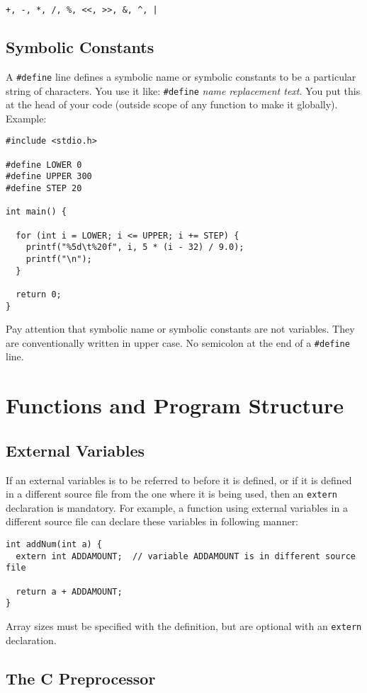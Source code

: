\documentclass[11pt]{article}
\begin{document}
\texttt{+, -, *, /, \%, <<, >>, \&, \textasciicircum{}, |}
\subsection{Symbolic Constants}
\label{sec:orgb128142}
A \texttt{\#define} line defines a symbolic name or symbolic constants to be a particular string of characters. You use it like: \texttt{\#define} \emph{name} \emph{replacement text}. You put this at the head of your code (outside scope of any function to make it globally). Example:
\begin{verbatim}
#include <stdio.h>

#define LOWER 0
#define UPPER 300
#define STEP 20

int main() {

  for (int i = LOWER; i <= UPPER; i += STEP) {
    printf("%5d\t%20f", i, 5 * (i - 32) / 9.0);
    printf("\n");
  }

  return 0;
}
\end{verbatim}
Pay attention that symbolic name or symbolic constants are not variables. They are conventionally written in upper case. No semicolon at the end of a \texttt{\#define} line.
\section{Functions and Program Structure}
\label{sec:org8a02354}
\subsection{External Variables}
\label{sec:org8441421}
If an external variables is to be referred to before it is defined, or if it is defined in a different source file from the one where it is being used, then an \texttt{extern} declaration is mandatory. For example, a function using external variables in a different source file can declare these variables in following manner:
\begin{verbatim}
int addNum(int a) {
  extern int ADDAMOUNT;  // variable ADDAMOUNT is in different source file

  return a + ADDAMOUNT;
}
\end{verbatim}
Array sizes must be specified with the definition, but are optional with an \texttt{extern} declaration.
\subsection{The C Preprocessor}
\label{sec:org5f399c2}
\end{document}
